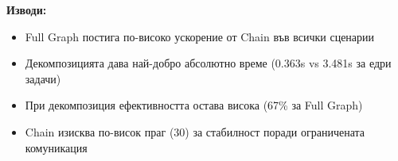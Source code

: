 \documentclass[12pt,a4paper]{article}
\begin{document}
\textbf{Изводи:}
\begin{itemize}
    \item Full Graph постига по-високо ускорение от Chain във всички сценарии
    \item Декомпозицията дава най-добро абсолютно време (0.363s vs 3.481s за едри задачи)
    \item При декомпозиция ефективността остава висока (67\% за Full Graph)
    \item Chain изисква по-висок праг (30) за стабилност поради ограничената комуникация
\end{itemize}
\end{document}
